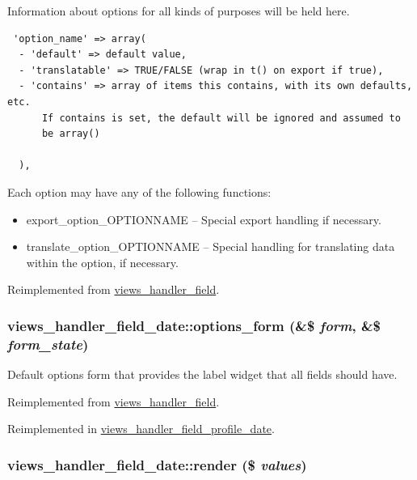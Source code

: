 Information about options for all kinds of purposes will be held here. 

\begin{Code}\begin{verbatim} 'option_name' => array(
  - 'default' => default value,
  - 'translatable' => TRUE/FALSE (wrap in t() on export if true),
  - 'contains' => array of items this contains, with its own defaults, etc.
      If contains is set, the default will be ignored and assumed to
      be array()

  ),
\end{verbatim}
\end{Code}

 Each option may have any of the following functions:\begin{itemize}
\item export\_\-option\_\-OPTIONNAME -- Special export handling if necessary.\item translate\_\-option\_\-OPTIONNAME -- Special handling for translating data within the option, if necessary. \end{itemize}


Reimplemented from \hyperlink{classviews__handler__field_64c69a8a3697603f8283405071c25b76}{views\_\-handler\_\-field}.\hypertarget{classviews__handler__field__date_cc152b1ff3dd0a65bc4d372c97c7c8e0}{
\subsubsection[{options\_\-form}]{\setlength{\rightskip}{0pt plus 5cm}views\_\-handler\_\-field\_\-date::options\_\-form (\&\$ {\em form}, \/  \&\$ {\em form\_\-state})}}
\label{classviews__handler__field__date_cc152b1ff3dd0a65bc4d372c97c7c8e0}


Default options form that provides the label widget that all fields should have. 

Reimplemented from \hyperlink{classviews__handler__field_0435d161922b7b4b84f02a2e79bb947a}{views\_\-handler\_\-field}.

Reimplemented in \hyperlink{classviews__handler__field__profile__date_ede3f5f93411ff64dd780b9837d19aec}{views\_\-handler\_\-field\_\-profile\_\-date}.\hypertarget{classviews__handler__field__date_4ed821df9270dc90bd3c2103d7136d47}{
\subsubsection[{render}]{\setlength{\rightskip}{0pt plus 5cm}views\_\-handler\_\-field\_\-date::render (\$ {\em values})}}
\label{classviews__handler__field__date_4ed821df9270dc90bd3c2103d7136d47}


